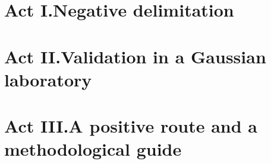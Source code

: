 \documentclass[a4paper,onecolumn,superscriptaddress,10pt,unpublished]{compositionalityarticle}
\begin{document}
\begin{abstract}
increases strictly under uniform scaling of any connected dynamics, or with a fixed scalar self-coupling (checked in Lean with Mathlib, as are the equivalence of $J>0$ with connected support and the min-cut bounds on $J$), but it can decrease against a fixed non-scalar self-coupling. Q is neither demonstrated nor refuted. Seven Lean files without Mathlib and a Lean project with Mathlib of eight modules, all without \texttt{sorry}, and fifteen scripts archived with the paper reproduce every result labelled as checked by Lean, by exact computation or numerically.
\end{abstract}



\part*{Act I.\quad Negative delimitation}





\part*{Act II.\quad Validation in a Gaussian laboratory}



\part*{Act III.\quad A positive route and a methodological guide}

\end{document}
